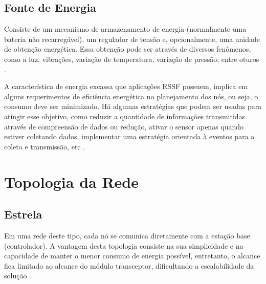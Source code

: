 \subsection{Fonte de Energia}
Consiste de um mecanismo de armazenamento de energia (normalmente uma bateria não recarregável), um regulador
de tensão e, opcionalmente, uma unidade de obtenção energética. Essa obtenção pode ser através de diversos
fenômenos, como a luz, vibrações, variação de temperatura, variação de pressão, entre oturos
\cite{kuorilehto2007,karl_willig2005}.

A característica de energia excassa que aplicações RSSF possuem, implica em alguns requerimentos de eficiência
energética no planejamento dos nós, ou seja, o consumo deve ser minimizado. Há algumas estratégias que podem
ser usadas para atingir esse objetivo, como reduzir a quantidade de informações transmitidas através de
compreensão de dados ou redução, ativar o sensor apenas quando estiver coletando dados, implementar uma
estratégia orientada à eventos para a coleta e transmissão, etc \cite{kuorilehto2007,townsend_arms2005}.

\section{Topologia da Rede}
\subsection{Estrela}
Em uma rede deste tipo, cada nó se comunica diretamente com a estação base (controlador). A vantagem
desta topologia consiste na sua simplicidade e na capacidade de manter o menor consumo de energia possível,
entretanto, o alcance fica limitado ao alcance do módulo transceptor, dificultando a escalabilidade da solução
\cite{dargie_poellabauer2010,townsend_arms2005}.

